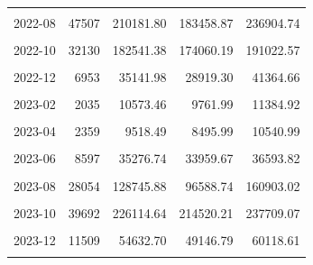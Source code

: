 \begin{longtable}[t]{crrrr}
\cellcolor{gray!10}{2022-07} & \cellcolor{gray!10}{14212} & \cellcolor{gray!10}{56971.44} & \cellcolor{gray!10}{48156.97} & \cellcolor{gray!10}{65785.90}\\
2022-08 & 47507 & 210181.80 & 183458.87 & 236904.74\\
\cellcolor{gray!10}{2022-09} & \cellcolor{gray!10}{60313} & \cellcolor{gray!10}{300160.50} & \cellcolor{gray!10}{285855.89} & \cellcolor{gray!10}{314465.11}\\
2022-10 & 32130 & 182541.38 & 174060.19 & 191022.57\\
\cellcolor{gray!10}{2022-11} & \cellcolor{gray!10}{16978} & \cellcolor{gray!10}{81752.70} & \cellcolor{gray!10}{71736.33} & \cellcolor{gray!10}{91769.06}\\
2022-12 & 6953 & 35141.98 & 28919.30 & 41364.66\\
\cellcolor{gray!10}{2023-01} & \cellcolor{gray!10}{2494} & \cellcolor{gray!10}{13741.73} & \cellcolor{gray!10}{10900.89} & \cellcolor{gray!10}{16582.58}\\
2023-02 & 2035 & 10573.46 & 9761.99 & 11384.92\\
\cellcolor{gray!10}{2023-03} & \cellcolor{gray!10}{2585} & \cellcolor{gray!10}{10749.86} & \cellcolor{gray!10}{9598.48} & \cellcolor{gray!10}{11901.23}\\
2023-04 & 2359 & 9518.49 & 8495.99 & 10540.99\\
\cellcolor{gray!10}{2023-05} & \cellcolor{gray!10}{5286} & \cellcolor{gray!10}{20512.80} & \cellcolor{gray!10}{19080.42} & \cellcolor{gray!10}{21945.18}\\
2023-06 & 8597 & 35276.74 & 33959.67 & 36593.82\\
\cellcolor{gray!10}{2023-07} & \cellcolor{gray!10}{13985} & \cellcolor{gray!10}{56559.83} & \cellcolor{gray!10}{47740.81} & \cellcolor{gray!10}{65378.86}\\
2023-08 & 28054 & 128745.88 & 96588.74 & 160903.02\\
\cellcolor{gray!10}{2023-09} & \cellcolor{gray!10}{46486} & \cellcolor{gray!10}{239696.27} & \cellcolor{gray!10}{225205.49} & \cellcolor{gray!10}{254187.05}\\
2023-10 & 39692 & 226114.64 & 214520.21 & 237709.07\\
\cellcolor{gray!10}{2023-11} & \cellcolor{gray!10}{26819} & \cellcolor{gray!10}{126192.75} & \cellcolor{gray!10}{106880.88} & \cellcolor{gray!10}{145504.63}\\
2023-12 & 11509 & 54632.70 & 49146.79 & 60118.61\\
\cellcolor{gray!10}{2024-01} & \cellcolor{gray!10}{4555} & \cellcolor{gray!10}{23408.57} & \cellcolor{gray!10}{19767.54} & \cellcolor{gray!10}{27049.60}\\

\end{longtable}
